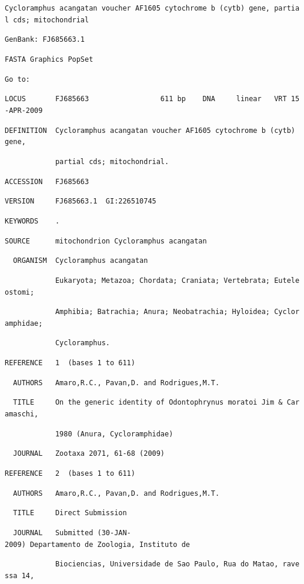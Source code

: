 \begin{refsection}
\scriptsize
\noindent\texttt{Cycloramphus~acangatan~voucher~AF1605~cytochrome~b~(cytb)~gene,~partial~cds;~mitochondrial}

\noindent\texttt{GenBank:~FJ685663.1}

\noindent\texttt{FASTA~Graphics~PopSet}

\noindent\texttt{Go~to:}

\noindent\texttt{LOCUS~~~~~~~FJ685663~~~~~~~~~~~~~~~~~611~bp~~~~DNA~~~~~linear~~~VRT~15-APR-2009}

\noindent\texttt{DEFINITION~~Cycloramphus~acangatan~voucher~AF1605~cytochrome~b~(cytb)~gene,}

\noindent\texttt{~~~~~~~~~~~~partial~cds;~mitochondrial.}

\noindent\texttt{ACCESSION~~~FJ685663}

\noindent\texttt{VERSION~~~~~FJ685663.1~~GI:226510745}

\noindent\texttt{KEYWORDS~~~~.}

\noindent\texttt{SOURCE~~~~~~mitochondrion~Cycloramphus~acangatan}

\noindent\texttt{~~ORGANISM~~Cycloramphus~acangatan}

\noindent\texttt{~~~~~~~~~~~~Eukaryota;~Metazoa;~Chordata;~Craniata;~Vertebrata;~Euteleostomi;}

\noindent\texttt{~~~~~~~~~~~~Amphibia;~Batrachia;~Anura;~Neobatrachia;~Hyloidea;~Cycloramphidae;}

\noindent\texttt{~~~~~~~~~~~~Cycloramphus.}

\noindent\texttt{REFERENCE~~~1~~(bases~1~to~611)}

\noindent\texttt{~~AUTHORS~~~Amaro,R.C.,~Pavan,D.~and~Rodrigues,M.T.}

\noindent\texttt{~~TITLE~~~~~On~the~generic~identity~of~Odontophrynus~moratoi~Jim~\&~Caramaschi,}

\noindent\texttt{~~~~~~~~~~~~1980~(Anura,~Cycloramphidae)}

\noindent\texttt{~~JOURNAL~~~Zootaxa~2071,~61-68~(2009)}

\noindent\texttt{REFERENCE~~~2~~(bases~1~to~611)}

\noindent\texttt{~~AUTHORS~~~Amaro,R.C.,~Pavan,D.~and~Rodrigues,M.T.}

\noindent\texttt{~~TITLE~~~~~Direct~Submission}

\noindent\texttt{~~JOURNAL~~~Submitted~(30-JAN-2009)~Departamento~de~Zoologia,~Instituto~de}

\noindent\texttt{~~~~~~~~~~~~Biociencias,~Universidade~de~Sao~Paulo,~Rua~do~Matao,~ravessa~14,}


\end{refsection}

